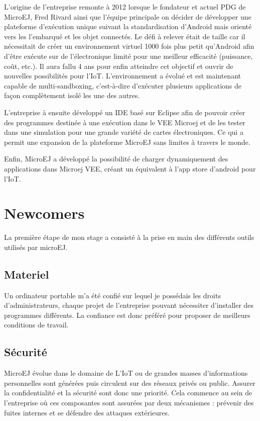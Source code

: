 \documentclass[french,a4paper,12pt]{report}
\begin{document}
L’origine de l’entreprise remonte à 2012 lorsque le fondateur et actuel PDG de MicroEJ, Fred Rivard ainsi que l’équipe principale on décider de développer une plateforme d’exécution unique suivant la standardisation d’Android mais orienté vers les l'embarqué et les objet connectés. Le défi à relever était de taille car il nécessitait de créer un environnement virtuel 1000 fois plus petit qu’Android afin d’être exécute sur de l’électronique limité pour une meilleur efficacité (puissance, coût, etc.). Il aura fallu 4 ans pour enfin atteindre cet objectif et ouvrir de nouvelles possibilités pour l’IoT. 
L'environnement a évolué et est maintenant capable de multi-sandboxing, c'est-à-dire d’exécuter plusieurs applications de façon complètement isolé les une des autres.


L’entreprise à ensuite développé un IDE basé sur Eclipse afin de pouvoir créer des programmes destinée à une exécution dans le VEE Microej et de les tester dans une simulation pour une grande variété de cartes électroniques. Ce qui a permit une expansion de la plateforme MicroEJ sans limites à travers le monde.

Enfin, MicroEJ a développé la possibilité de charger dynamiquement des applications dans Microej VEE, créant un équivalent à l'app store d'android pour l'IoT. 

\chapter{Newcomers}

La première étape de mon stage a consisté à la prise en main des différents outils utilisés par microEJ.  

\section{Materiel} 

Un ordinateur portable m’a été confié sur lequel je possédais les droits d’administrateurs, chaque projet de l’entreprise pouvant nécessiter d’installer des programmes différents. La confiance est donc préféré pour proposer de meilleurs conditions de travail.

\section{Sécurité}

MicroEJ évolue dans le domaine de L'IoT ou de grandes masses d'informations personnelles sont générées puis circulent sur des réseaux privés ou public. Assurer la confidentialité et la sécurité sont donc une priorité. Cela commence au sein de l'entreprise où ces composantes sont assurées par deux mécanismes : prévenir des fuites internes et se défendre des attaques extérieures.
\end{document}
